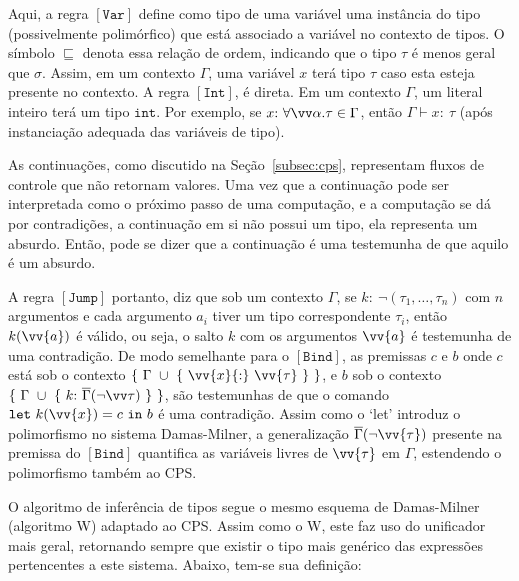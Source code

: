 Aqui, a regra $\mathtt{[Var]}$ define como tipo de uma variável uma instância do tipo (possivelmente polimórfico) que está associado a variável no contexto de tipos.
O símbolo $\sqsubseteq$ denota essa relação de ordem, indicando que o tipo $\tau$ é menos geral que $\sigma$.
Assim, em um contexto $\Gamma$, uma variável $x$ terá tipo $\tau$ caso esta esteja presente no contexto.
A regra $\mathtt{[Int]}$, é direta.
Em um contexto $\Gamma$, um literal inteiro terá um tipo $\mathtt{int}$.
Por exemplo, se $x{:}\ \forall\vv\alpha.\tau\in\Gamma$, então $\Gamma\vdash x{:}\ \tau$ (após instanciação adequada das variáveis de tipo).

As continuações, como discutido na Seção~\ref{subsec:cps}, representam fluxos de controle que não retornam valores.
Uma vez que a continuação pode ser interpretada como o próximo passo de uma computação, e a computação se dá por contradições, a continuação em si não possui um tipo, ela representa um absurdo.
Então, pode se dizer que a continuação é uma testemunha de que aquilo é um absurdo.

A regra $[\mathtt{Jump}]$ portanto, diz que sob um contexto $\Gamma$, se $k{:}\ \neg(\tau_1,\dots,\tau_n)$ com $n$ argumentos e cada argumento $a_i$ tiver um tipo correspondente $\tau_i$, então $k(\vv{a})$ é válido, ou seja, o salto $k$ com os argumentos $\vv{a}$ é testemunha de uma contradição.
De modo semelhante para o $\mathtt{[Bind]}$, as premissas $c$ e $b$ onde $c$ está sob o contexto $\{\ \Gamma\ \cup\ \{\ \vv{x}{:}\ \vv{\tau}\ \}\ \}$, e $b$ sob o contexto $\{\ \Gamma\ \cup\ \{\ k{:}\ \overline{\Gamma}(\neg\vv\tau)\ \}\ \}$, são testemunhas de que o comando $\mathtt{let}\ k(\vv{x}) = c\ \mathtt{in}\ b$ é uma contradição.
Assim como o `let' introduz o polimorfismo no sistema Damas-Milner, a generalização $\overline{\Gamma}(\neg\vv{\tau})$ presente na premissa do $\mathtt{[Bind]}$ quantifica as variáveis livres de $\vv{\tau}$ em $\Gamma$, estendendo o polimorfismo também ao CPS.

O algoritmo de inferência de tipos segue o mesmo esquema de Damas-Milner (algoritmo W) adaptado ao CPS.
Assim como o W, este faz uso do unificador mais geral, retornando sempre que existir o tipo mais genérico das expressões pertencentes a este sistema.
Abaixo, tem-se sua definição:

\phantom{Newline}


\begin{prooftree}
\end{prooftree}

